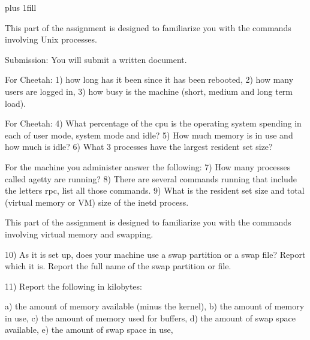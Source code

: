 
\rightskip=0pt plus 1fill

\parindent 0pt

This part of the assignment is designed to familiarize you with the
commands involving Unix processes.

Submission: You will submit a written document.

For Cheetah: 1) how long has it been since it has
been rebooted, 2) how many users are logged in, 3) how busy is the machine
(short, medium and long term load).

For Cheetah: 4) What percentage of the cpu is the operating system
spending in each of user mode, system mode and idle?
5) How much memory is in use and
how much is idle?
6) What 3 processes have the largest resident set size?

For the machine you administer answer the following:
7) How many processes called {\ltt{}agetty} are running?
8) There are several commands running that include the letters {\ltt{}rpc},
list all those commands.
9) What is the resident set size and total (virtual memory or VM) size of the
{\ltt{}inetd} process.

%
%

This part of the assignment is designed to familiarize you with the
commands involving virtual memory and swapping.

10) As it is set up,
does your machine use a swap partition or a swap file? 
Report which it is.
Report the full name of the swap partition or file.

11) Report the following in kilobytes:

a) the amount of memory available (minus the kernel),
\break
b) the amount of memory in use,
\break
c) the amount of memory used for buffers,
\break
d) the amount of swap space available,
\break
e) the amount of swap space in use,

